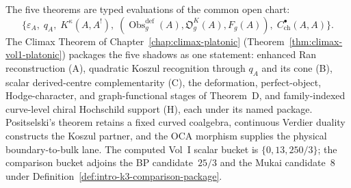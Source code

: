 \begin{remark}
\label{rem:unified-five-theorem-identity}
%
The five theorems are typed evaluations of the common open chart:
\[
\{\varepsilon_A,\;q_A,\;K^\kappa(A,A^!),\;
(\operatorname{Obs}^{\mathrm{def}}_g(A),\mathfrak O_g^K(A),F_g(A)),\;
C^\bullet_{\mathrm{ch}}(A,A)\}.
\]
The Climax Theorem of Chapter~\ref{chap:climax-platonic}
(Theorem~\ref{thm:climax-vol1-platonic}) packages the five shadows as
one statement: enhanced Ran reconstruction (A), quadratic Koszul
recognition through $q_A$ and its cone (B), scalar derived-centre
complementarity (C), the deformation, perfect-object, Hodge-character,
and graph-functional stages of Theorem~D, and family-indexed
curve-level chiral Hochschild support (H), each under its
named package.  Positselski's theorem retains a fixed curved
coalgebra, continuous Verdier duality constructs the Koszul partner,
and the OCA morphism supplies the physical boundary-to-bulk lane.  The
computed Vol~I scalar bucket is $\{0,13,250/3\}$; the comparison
bucket adjoins the \ClaimStatusConjectured{} BP candidate~$25/3$ and
the \ClaimStatusConjectured{} Mukai candidate~$8$ under
Definition~\ref{def:intro-k3-comparison-package}.
\end{remark}
